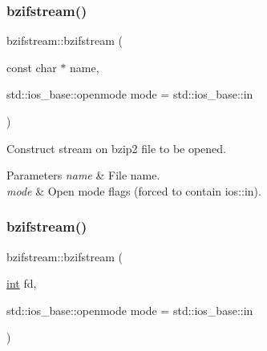 \mbox{\label{classbzifstream_a47dfbb262a812ab111fbae3c904e2d80}} 
\subsubsection{\texorpdfstring{bzifstream()}{bzifstream()}\hspace{0.1cm}{\footnotesize\ttfamily [2/3]}}
{\footnotesize\ttfamily bzifstream\+::bzifstream (\begin{DoxyParamCaption}\item[{const char $\ast$}]{name,  }\item[{std\+::ios\+\_\+base\+::openmode}]{mode = {\ttfamily std\+:\+:ios\+\_\+base\+:\+:in} }\end{DoxyParamCaption})\hspace{0.3cm}{\ttfamily [explicit]}}



Construct stream on bzip2 file to be opened. 


\begin{DoxyParams}{Parameters}
{\em name} & File name. \\
\hline
{\em mode} & Open mode flags (forced to contain ios\+::in). \\
\hline
\end{DoxyParams}
\mbox{\label{classbzifstream_ab60c53e07d9a3732095906f06350c0fb}} 
\subsubsection{\texorpdfstring{bzifstream()}{bzifstream()}\hspace{0.1cm}{\footnotesize\ttfamily [3/3]}}
{\footnotesize\ttfamily bzifstream\+::bzifstream (\begin{DoxyParamCaption}\item[{\hyperlink{lp__lib_8h_adeb9ec6400320e4923ac9d836d509ddb}{int}}]{fd,  }\item[{std\+::ios\+\_\+base\+::openmode}]{mode = {\ttfamily std\+:\+:ios\+\_\+base\+:\+:in} }\end{DoxyParamCaption})\hspace{0.3cm}{\ttfamily [explicit]}}



